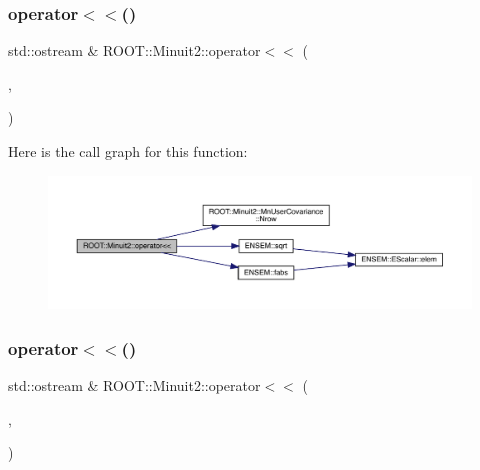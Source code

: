 \subsubsection{\texorpdfstring{operator$<$$<$()}{operator<<()}\hspace{0.1cm}{\footnotesize\ttfamily [6/11]}}
{\footnotesize\ttfamily std\+::ostream \& R\+O\+O\+T\+::\+Minuit2\+::operator$<$$<$ (\begin{DoxyParamCaption}\item[{std\+::ostream \&}]{,  }\item[{const \mbox{\hyperlink{classROOT_1_1Minuit2_1_1MnUserCovariance}{Mn\+User\+Covariance}} \&}]{ }\end{DoxyParamCaption})}

Here is the call graph for this function\+:
\nopagebreak
\begin{figure}[H]
\begin{center}
\leavevmode
\includegraphics[width=350pt]{d6/d3a/namespaceROOT_1_1Minuit2_ab0d367617b39c46b8b0eeef75ecc5b75_cgraph}
\end{center}
\end{figure}
\mbox{\label{namespaceROOT_1_1Minuit2_ad8fa7aff1b1b2645f8b2a9c9a2231252}} 
\subsubsection{\texorpdfstring{operator$<$$<$()}{operator<<()}\hspace{0.1cm}{\footnotesize\ttfamily [7/11]}}
{\footnotesize\ttfamily std\+::ostream \& R\+O\+O\+T\+::\+Minuit2\+::operator$<$$<$ (\begin{DoxyParamCaption}\item[{std\+::ostream \&}]{,  }\item[{const \mbox{\hyperlink{classROOT_1_1Minuit2_1_1MnGlobalCorrelationCoeff}{Mn\+Global\+Correlation\+Coeff}} \&}]{ }\end{DoxyParamCaption})}

